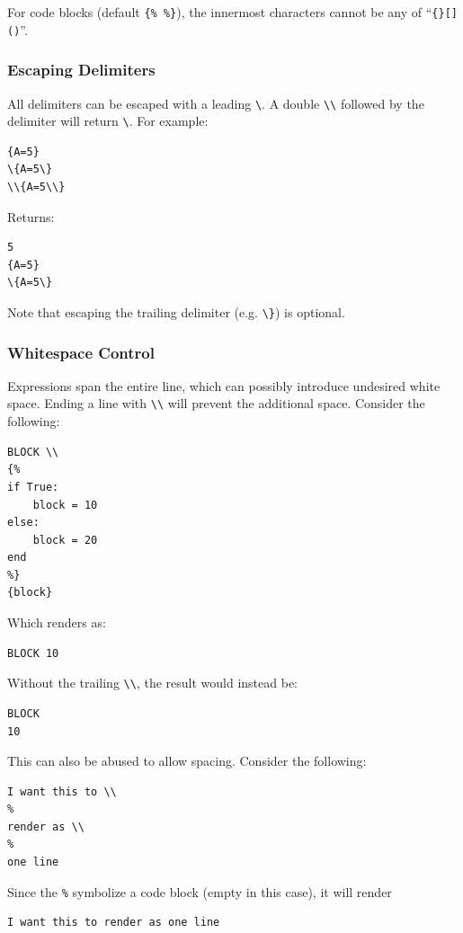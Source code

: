 {For code blocks (default \texttt{\{\%\ \%\}}), the innermost characters
cannot be any of ``\texttt{\{\}{[}{]}()}''.

\subsubsection{Escaping Delimiters}\label{interfaces:escaping-delimiters}

All delimiters can be escaped with a leading \texttt{\textbackslash{}}.
A double \texttt{\textbackslash{}\textbackslash{}} followed by the
delimiter will return \texttt{\textbackslash{}}. For example:

\begin{verbatim}
{A=5}
\{A=5\}
\\{A=5\\}
\end{verbatim}

Returns:

\begin{verbatim}
5
{A=5}
\{A=5\}  
\end{verbatim}

Note that escaping the trailing delimiter (e.g.
\texttt{\textbackslash{}\}}) is optional.

\subsubsection{Whitespace Control}\label{interfaces:whitespace-control}

Expressions span the entire line, which can possibly introduce undesired white space. 
Ending a line with \texttt{\textbackslash\textbackslash} will prevent the additional space. Consider the following:
\begin{verbatim}
BLOCK \\
{%
if True:
    block = 10
else:
    block = 20
end
%}
{block}
\end{verbatim}

Which renders as:
\begin{verbatim}
BLOCK 10
\end{verbatim}

Without the trailing \texttt{\textbackslash\textbackslash}, the result would instead be:
\begin{verbatim}
BLOCK
10
\end{verbatim}
This can also be abused to allow spacing. Consider the following:

\begin{verbatim}
I want this to \\
%
render as \\
%
one line
\end{verbatim}
Since the \texttt{\%} symbolize a code block (empty in this case), it will render
\begin{verbatim}
I want this to render as one line
\end{verbatim}

}
